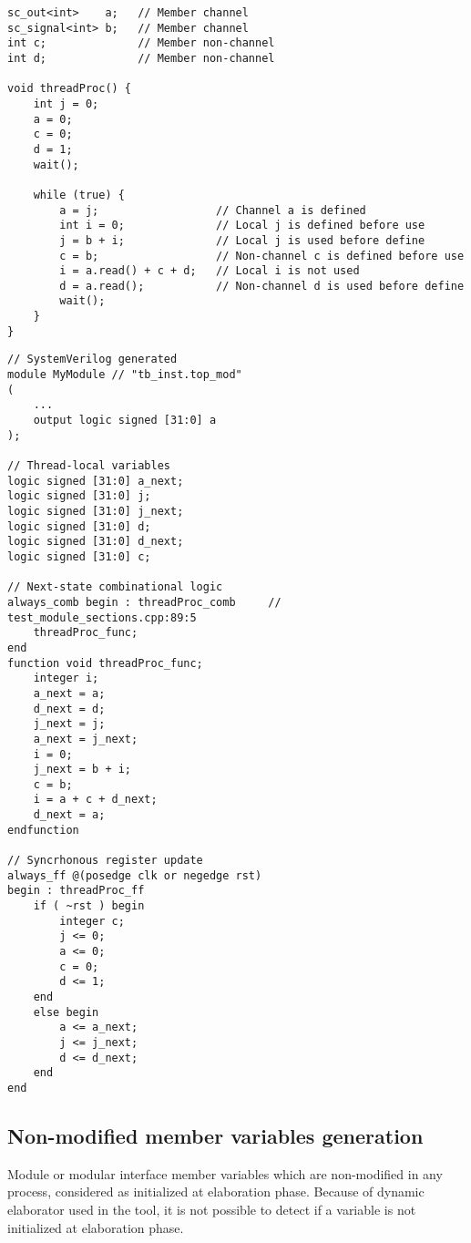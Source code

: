 \begin{lstlisting}[style=mycpp]
sc_out<int>    a;   // Member channel
sc_signal<int> b;   // Member channel
int c;              // Member non-channel
int d;              // Member non-channel

void threadProc() {
    int j = 0;          
    a = 0;
    c = 0;
    d = 1;
    wait();

    while (true) {
        a = j;                  // Channel a is defined
        int i = 0;              // Local j is defined before use
        j = b + i;              // Local j is used before define
        c = b;                  // Non-channel c is defined before use
        i = a.read() + c + d;   // Local i is not used
        d = a.read();           // Non-channel d is used before define
        wait();
    }
}
\end{lstlisting}
%
\begin{lstlisting}[style=myverilog]
// SystemVerilog generated
module MyModule // "tb_inst.top_mod"
(
    ...
    output logic signed [31:0] a
);

// Thread-local variables
logic signed [31:0] a_next;
logic signed [31:0] j;
logic signed [31:0] j_next;
logic signed [31:0] d;
logic signed [31:0] d_next;
logic signed [31:0] c;

// Next-state combinational logic
always_comb begin : threadProc_comb     // test_module_sections.cpp:89:5
    threadProc_func;
end
function void threadProc_func;
    integer i;
    a_next = a;
    d_next = d;
    j_next = j;
    a_next = j_next;
    i = 0;
    j_next = b + i;
    c = b;
    i = a + c + d_next;
    d_next = a;
endfunction

// Syncrhonous register update
always_ff @(posedge clk or negedge rst) 
begin : threadProc_ff
    if ( ~rst ) begin
        integer c;
        j <= 0;
        a <= 0;
        c = 0;
        d <= 1;
    end
    else begin
        a <= a_next;
        j <= j_next;
        d <= d_next;
    end
end
\end{lstlisting}

\subsection{Non-modified member variables generation}\label{section:non_modif_var_gen}
Module or modular interface member variables which are non-modified in any process, considered as initialized at elaboration phase. Because of dynamic elaborator used in the tool, it is not possible to detect if a variable is not initialized at elaboration phase. 

